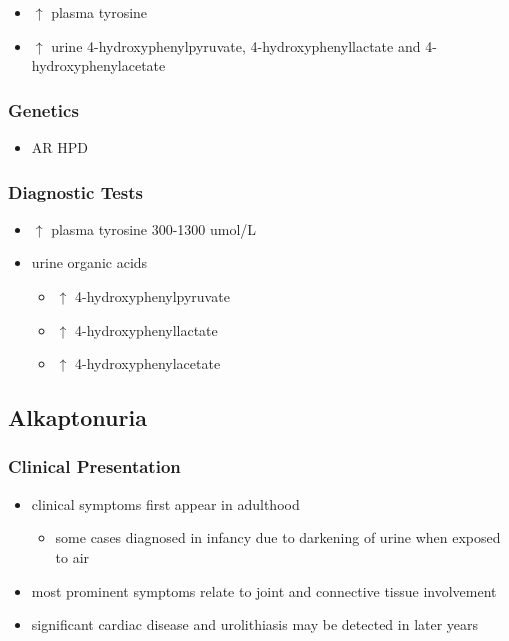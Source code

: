 \documentclass[12pt]{scrartcl}
\begin{document}

\begin{itemize}
\item \(\uparrow\) plasma tyrosine
\item \(\uparrow\) urine 4-hydroxyphenylpyruvate, 4-hydroxyphenyllactate and 4-hydroxyphenylacetate
\end{itemize}
\subsubsection{Genetics}
\label{sec:orga83fa78}
\begin{itemize}
\item AR HPD
\end{itemize}
\subsubsection{Diagnostic Tests}
\label{sec:orgf97c903}
\begin{itemize}
\item \(\uparrow\) plasma tyrosine 300-1300 umol/L
\item urine organic acids
\begin{itemize}
\item \(\uparrow\) 4-hydroxyphenylpyruvate
\item \(\uparrow\) 4-hydroxyphenyllactate
\item \(\uparrow\) 4-hydroxyphenylacetate
\end{itemize}
\end{itemize}

\subsection{Alkaptonuria}
\label{sec:orgf4c7574}
\subsubsection{Clinical Presentation}
\label{sec:orgef25ae7}
\begin{itemize}
\item clinical symptoms first appear in adulthood
\begin{itemize}
\item some cases diagnosed in infancy due to darkening of urine when
exposed to air
\end{itemize}
\item most prominent symptoms relate to joint and connective tissue involvement
\item significant cardiac disease and urolithiasis may be detected in later years
\end{itemize}
\end{document}
